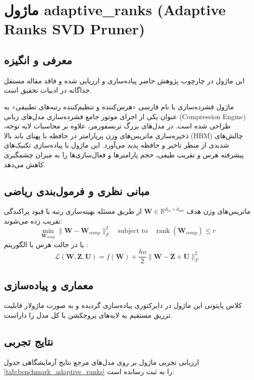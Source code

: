 \section{ماژول adaptive\_ranks (Adaptive Ranks SVD Pruner)}
\label{sec:module_adaptive_ranks}

\subsection{معرفی و انگیزه}
این ماژول در چارچوب پژوهش حاضر پیاده‌سازی و ارزیابی شده و فاقد مقاله مستقل جداگانه در ادبیات تحقیق است.

ماژول فشرده‌سازی  با نام فارسی «هرس‌کننده و تنظیم‌کننده رتبه‌های تطبیقی» به عنوان یکی از اجزای موتور جامع فشرده‌سازی مدل‌های زبانی (Compression Engine) طراحی شده است. در مدل‌های بزرگ ترنسفورمر، علاوه بر محاسبات لایه توجه، ذخیره‌سازی ماتریس‌های وزن پرپارامتر در حافظه با پهنای باند بالا (HBM) چالش‌های شدیدی از منظر تاخیر و حافظه پدید می‌آورد. این ماژول با پیاده‌سازی تکنیک‌های پیشرفته هرس و تقریب طیفی، حجم پارامترها و فعال‌سازی‌ها را به میزان چشمگیری کاهش می‌دهد.

\subsection{مبانی نظری و فرمول‌بندی ریاضی}
ماتریس‌های وزن هدف $\mathbf{W} \in \mathbb{R}^{d_{in} \times d_{out}}$ از طریق مسئله بهینه‌سازی رتبه یا قیود پراکندگی تقریب زده می‌شوند:
 \begin{equation}
\min_{\mathbf{W}_{comp}} \|\mathbf{W} - \mathbf{W}_{comp}\|_F^2 \quad \text{subject to} \quad \operatorname{rank}(\mathbf{W}_{comp}) \le r
\end{equation}
یا در حالت هرس با الگوریتم :
 \begin{equation}
\mathcal{L}(\mathbf{W}, \mathbf{Z}, \mathbf{U}) = f(\mathbf{W}) +\frac{
ho}{2} \|\mathbf{W} - \mathbf{Z} + \mathbf{U}\|_F^2
\end{equation}

\subsection{معماری و پیاده‌سازی}
کلاس پایتونی این ماژول در دایرکتوری  پیاده‌سازی گردیده و به صورت ماژولار قابلیت تزریق مستقیم به لایه‌های پروجکشن یا کل مدل را داراست.

\subsection{نتایج تجربی}
ارزیابی تجربی ماژول  بر روی مدل‌های مرجع نتایج آزمایشگاهی جدول 
\ref{tab:benchmark_adaptive_ranks} را به ثبت رسانده است:

